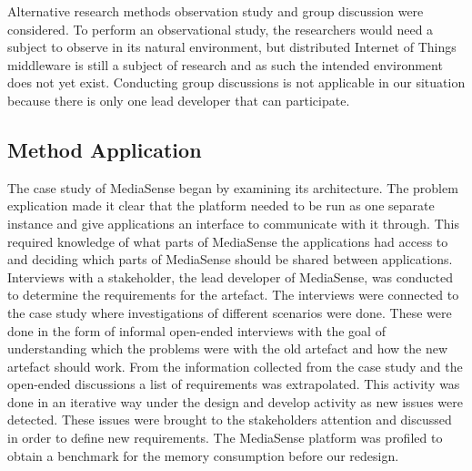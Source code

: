 Alternative research methods observation study and group discussion were considered. To perform an observational study, the researchers would need a subject to observe in its natural environment, but distributed Internet of Things middleware is still a subject of research and as such the intended environment does not yet exist. Conducting group discussions is not applicable in our situation because there is only one lead developer that can participate. 

%

\subsection{Method Application}
The case study of MediaSense began by examining its architecture. The problem explication made it clear that the platform needed to be run as one separate instance and give applications an interface to communicate with it through. This required knowledge of what parts of MediaSense the applications had access to and deciding which parts of MediaSense should be shared between applications. Interviews with a stakeholder, the lead developer of MediaSense, was conducted to determine the requirements for the artefact. The interviews were connected to the case study where investigations of different scenarios were done. These were done in the form of informal open-ended interviews with the goal of understanding which the problems were with the old artefact and how the new artefact should work.
From the information collected from the case study and the open-ended discussions a list of requirements was extrapolated. This activity was done in an iterative way under the design and develop activity as new issues were detected. These issues were brought to the stakeholders attention and discussed in order to define new requirements. The MediaSense platform was profiled to obtain a benchmark for the memory consumption before our redesign.